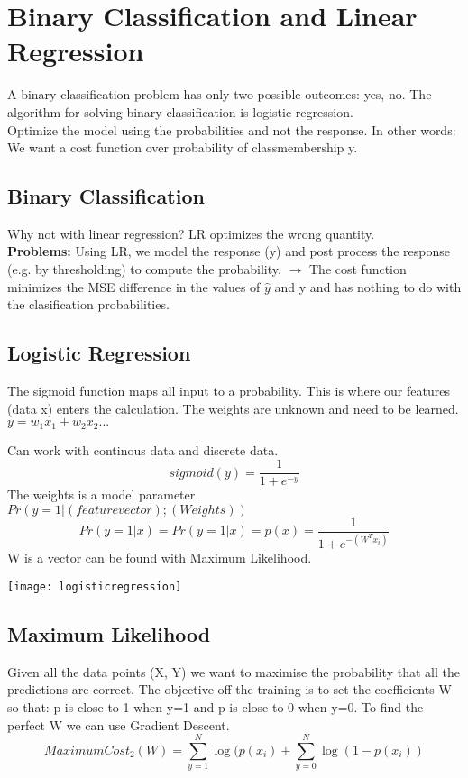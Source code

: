 \section{Binary Classification and Linear Regression}
A binary classification problem has only two possible outcomes: yes, no. The algorithm for solving binary classification is logistic regression.\\
Optimize the model using the probabilities and not the response. In other words: We want a cost function over probability of classmembership y.

\subsection{Binary Classification}
Why not with linear regression? LR optimizes the wrong quantity.\\
\textbf{Problems:} Using LR, we model the response (y) and post process the response (e.g. by thresholding) to compute the probability. $\rightarrow$ The cost function minimizes the MSE difference in the values of $\hat{y}$ and y and has nothing to do with the clasification probabilities.

\subsection{Logistic Regression}
 The sigmoid function maps all input to a probability. This is where our features (data x) enters the calculation. The weights are unknown and need to be learned. 
$y=w_{1} x_{1}+w_{2} x_{2}...$

\begin{minipage}{0,6\linewidth}
	Can work with continous data and discrete data.
	\[ sigmoid(y) = \frac{1}{1+ e^{-y}} \] 
	The weights is a model parameter. \\
	$Pr(y=1|(feature vector); (Weights))$\\
	\[ Pr(y=1|x) = Pr(y=1|x) = p(x) = \frac{1}{1+e^{-(W^{T} x_{i})}} \]
	W is a vector can be found with Maximum Likelihood. 
\end{minipage}
\begin{minipage}{0,4\linewidth}
	\texttt{[image: logisticregression]}
\end{minipage}

\subsection{Maximum Likelihood}
Given all the data points (X, Y) we want to maximise the probability that all the predictions are correct. The objective off the training is to set the coefficients W so that: p is close to 1 when y=1 and p is close to 0 when y=0. To find the perfect W we can use Gradient Descent.
\[ Maximum Cost_{2}(W) = \sum_{y=1}^{N} \log(p(x_{i}) + \sum_{y=0}^{N} \log(1-p(x_{i})) \]



